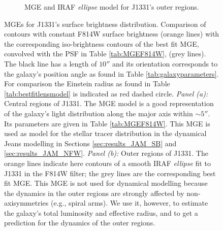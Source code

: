 \documentclass[useAMS,usenatbib]{mnras}
\begin{document}
\begin{figure}
\begin{subfigure}{.5\textwidth}
  \caption{MGE and IRAF \emph{ellipse} model for J1331's outer regions.}
 \label{fig:MGEouterRegions}
\end{subfigure}%
\caption{MGEs for J1331's surface brightness distribution. Comparison of contours with constant F814W surface brightness (orange lines) with the corresponding iso-brightness contours of the best fit MGE, convolved with the PSF in Table \ref{tab:MGEF814W}, (grey lines). The black line has a length of $10''$ and its orientation corresponds to the galaxy's position angle as found in Table \ref{tab:galaxyparameters}. For comparison the Einstein radius as found in Table \ref{tab:bestfitlensmodel}  is indicated as red dashed circle. \emph{Panel (a):} Central regions of J1331. The MGE model is a good representation of the galaxy's light distribution along the major axis within $\sim 5''$. Its parameters are given in Table \ref{tab:MGEF814W}. This MGE is used as model for the stellar tracer distribution in the dynamical Jeans modelling in Sections \ref{sec:results_JAM_SB} and \ref{sec:results_JAM_NFW}. \emph{Panel (b):} Outer regions of J1331. The orange lines indicate here contours of a smooth IRAF \emph{ellipse} fit to J1331 in the F814W filter; the grey lines are the corresponding best fit MGE. This MGE is not used for dynamical modelling because the dynamics in the outer regions are strongly affected by non-axisymmetries (e.g., spiral arms). We use it, however, to estimate the galaxy's total luminosity and effective radius, and to get a prediction for the dynamics of the outer regions.}
\end{figure}
\end{document}

